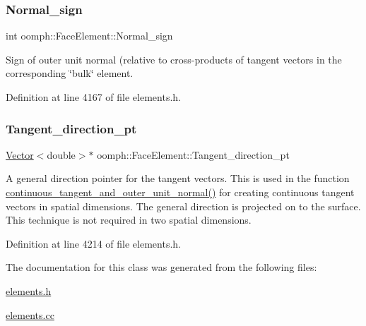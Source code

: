 \subsubsection{\texorpdfstring{Normal\+\_\+sign}{Normal\_sign}}
{\footnotesize\ttfamily int oomph\+::\+Face\+Element\+::\+Normal\+\_\+sign\hspace{0.3cm}{\ttfamily [private]}}



Sign of outer unit normal (relative to cross-\/products of tangent vectors in the corresponding \char`\"{}bulk\char`\"{} element. 



Definition at line 4167 of file elements.\+h.

\mbox{\label{classoomph_1_1FaceElement_a6be4abd12fb4edbd94b7613f62de3593}} 
\subsubsection{\texorpdfstring{Tangent\+\_\+direction\+\_\+pt}{Tangent\_direction\_pt}}
{\footnotesize\ttfamily \hyperlink{classoomph_1_1Vector}{Vector}$<$double$>$$\ast$ oomph\+::\+Face\+Element\+::\+Tangent\+\_\+direction\+\_\+pt\hspace{0.3cm}{\ttfamily [protected]}}



A general direction pointer for the tangent vectors. This is used in the function \hyperlink{classoomph_1_1FaceElement_a182997beb4a64fde40a47007344913f1}{continuous\+\_\+tangent\+\_\+and\+\_\+outer\+\_\+unit\+\_\+normal()} for creating continuous tangent vectors in spatial dimensions. The general direction is projected on to the surface. This technique is not required in two spatial dimensions. 



Definition at line 4214 of file elements.\+h.



The documentation for this class was generated from the following files\+:\begin{DoxyCompactItemize}
\item 
\hyperlink{elements_8h}{elements.\+h}\item 
\hyperlink{elements_8cc}{elements.\+cc}\end{DoxyCompactItemize}
